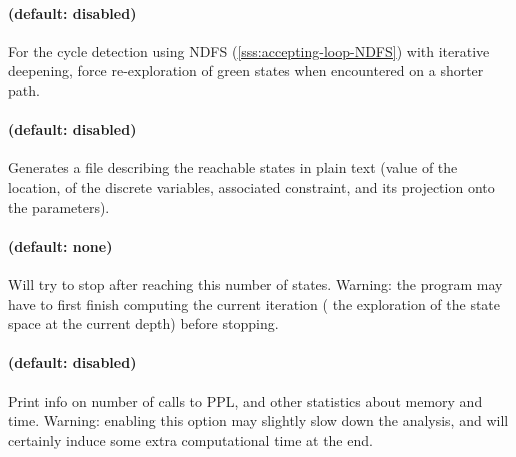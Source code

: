 \paragraph{ (default: disabled)}
For the cycle detection using NDFS (\cref{sss:accepting-loop-NDFS}) with iterative deepening, force re-exploration of
green states when encountered on a shorter path.




\paragraph{ (default: disabled)}
Generates a file  describing the reachable states in plain text (value of the location, of the discrete variables, associated constraint, and its projection onto the parameters).




\paragraph{ (default: none)}
Will try to stop after reaching this number of states.
Warning: the program may have to first finish computing the current iteration (\ie{} the exploration of the state space at the current depth) before stopping.


\paragraph{ (default: disabled)}
Print info on number of calls to PPL, and other statistics about memory and time.
Warning: enabling this option may slightly slow down the analysis, and will certainly induce some extra computational time at the end.




